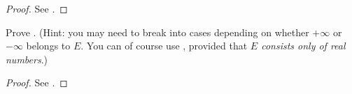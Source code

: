 \begin{proof}
See .
\end{proof}

\begin{exercise} \label{exercise 6.2.2}
Prove .
(Hint: you may need to break into cases depending on whether \(+\infty\) or \(-\infty\) belongs to \(E\).
You can of course use , provided that \emph{\(E\) consists only of real numbers}.)
\end{exercise}

\begin{proof}
See .
\end{proof}